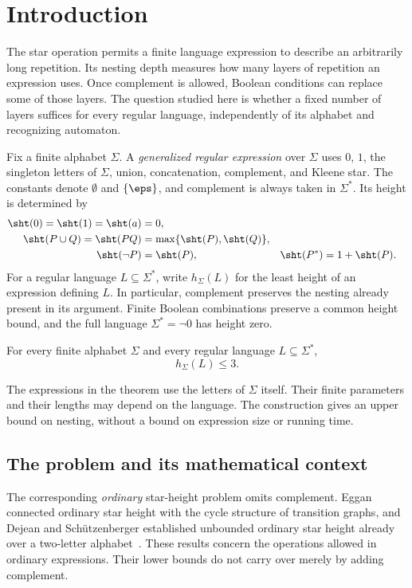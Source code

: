 \section{Introduction}\label{sec:introduction}

The star operation permits a finite language expression to describe an
arbitrarily long repetition. Its nesting depth measures how many layers
of repetition an expression uses. Once complement is allowed, Boolean
conditions can replace some of those layers. The question studied here
is whether a fixed number of layers suffices for every regular language,
independently of its alphabet and recognizing automaton.

Fix a finite alphabet $\Sigma$. A \emph{generalized regular expression}
over $\Sigma$ uses $0$, $1$, the singleton letters of $\Sigma$, union,
concatenation, complement, and Kleene star. The constants denote
$\emptyset$ and $\{\eps\}$, and complement is always taken in $\Sigma^*$.
Its height is determined by
\[
\begin{aligned}
 \sht(0)=\sht(1)=\sht(a)&=0,\\
 \sht(P\cup Q)=\sht(PQ)&=\max\{\sht(P),\sht(Q)\},\\
 \sht(\neg P)&=\sht(P),&
 \sht(P^*)&=1+\sht(P).
\end{aligned}
\]
For a regular language $L\subseteq\Sigma^*$, write $h_\Sigma(L)$ for
the least height of an expression defining $L$. In particular,
complement preserves the nesting already present in its argument. Finite
Boolean combinations preserve a common height bound, and the full
language $\Sigma^*=\neg0$ has height zero.

\begin{theorem}\label{thm:main}
For every finite alphabet $\Sigma$ and every regular language
$L\subseteq\Sigma^*$,
\[
                            h_\Sigma(L)\le3.
\]
\end{theorem}

The expressions in the theorem use the letters of $\Sigma$ itself. Their
finite parameters and their lengths may depend on the language. The
construction gives an upper bound on nesting, without a bound on
expression size or running time.

\subsection{The problem and its mathematical context}

The corresponding \emph{ordinary} star-height problem omits complement.
Eggan connected ordinary star height with the cycle structure of
transition graphs, and Dejean and Sch\"utzenberger established unbounded
ordinary star height already over a two-letter
alphabet~\cite{Eggan1963,DejeanSchutzenberger1966}. These results concern
the operations allowed in ordinary expressions. Their lower bounds do
not carry over merely by adding complement.

